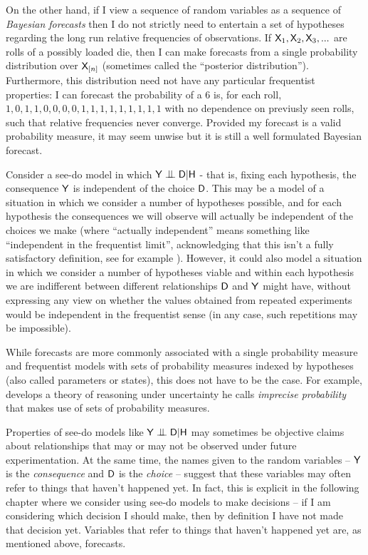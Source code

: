 On the other hand, if I view a sequence of random variables as a sequence of \emph{Bayesian forecasts} then I do not strictly need to entertain a set of hypotheses regarding the long run relative frequencies of observations. If $\mathsf{X}_1,\mathsf{X}_2,\mathsf{X}_3,...$ are rolls of a possibly loaded die, then I can make forecasts from a single probability distribution over $\mathsf{X}_{[n]}$ (sometimes called the ``posterior distribution''). Furthermore, this distribution need not have any particular frequentist properties: I can forecast the probability of a $6$ is, for each roll, $1,0,1,1,0,0,0,0,1,1,1,1,1,1,1,1,1$ with no dependence on previusly seen rolls, such that relative frequencies never converge. Provided my forecast is a valid probability measure, it may seem unwise but it is still a well formulated Bayesian forecast.

Consider a see-do model in which $\RV{Y}\CI\RV{D}|\RV{H}$ - that is, fixing each hypothesis, the consequence $\mathsf{Y}$ is independent of the choice $\mathsf{D}$. This may be a model of a situation in which we consider a number of hypotheses possible, and for each hypothesis the consequences we will observe will actually be independent of the choices we make (where ``actually independent'' means something like ``independent in the frequentist limit'', acknowledging that this isn't a fully satisfactory definition, see for example \citet{hajek_interpretations_2019}).  However, it could also model a situation in which we consider a number of hypotheses viable and within each hypothesis we are indifferent between different relationships $\mathsf{D}$ and $\mathsf{Y}$ might have, without expressing any view on whether the values obtained from repeated experiments would be independent in the frequentist sense (in any case, such repetitions may be impossible).

While forecasts are more commonly associated with a single probability measure and frequentist models with sets of probability measures indexed by hypotheses (also called parameters or states), this does not have to be the case. For example, \citet{walley_statistical_1991} develops a theory of reasoning under uncertainty he calls \emph{imprecise probability} that makes use of sets of probability measures.

Properties of see-do models like $\RV{Y}\CI\RV{D}|\RV{H}$ may sometimes be objective claims about relationships that may or may not be observed under future experimentation. At the same time, the names given to the random variables -- $\mathsf{Y}$ is the \emph{consequence} and $\mathsf{D}$ is the \emph{choice} -- suggest that these variables may often refer to things that haven't happened yet. In fact, this is explicit in the following chapter where we consider using see-do models to make decisions -- if I am considering which decision I should make, then by definition I have not made that decision yet. Variables that refer to things that haven't happened yet are, as mentioned above, forecasts.

